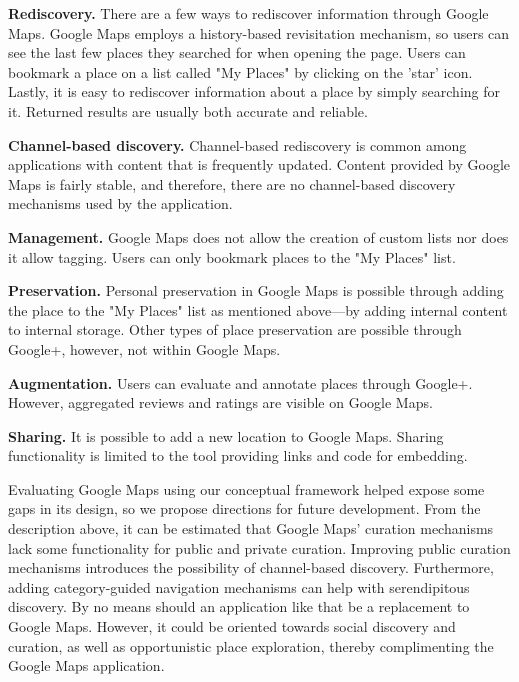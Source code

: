 {\textbf{Rediscovery.} There are a few ways to rediscover information through Google Maps. Google Maps employs a history-based revisitation mechanism, so users can see the last few places they searched for when opening the page. Users can bookmark a place on a list called "My Places" by clicking on the 'star' icon. Lastly, it is easy to rediscover information about a place by simply searching for it. Returned results are usually both accurate and reliable.

\textbf{Channel-based discovery.} Channel-based rediscovery is common among applications with content that is frequently updated. Content provided by Google Maps is fairly stable, and therefore, there are no channel-based discovery mechanisms used by the application.

\textbf{Management.} Google Maps does not allow the creation of custom lists nor does it allow tagging. Users can only bookmark places to the "My Places" list. 

\textbf{Preservation.} Personal preservation in Google Maps is possible through adding the place to the "My Places" list as mentioned above---by adding internal content to internal storage. Other types of place preservation are possible through Google+, however, not within Google Maps.

\textbf{Augmentation.} Users can evaluate and annotate places through Google+. However, aggregated reviews and ratings are visible on Google Maps. 

\textbf{Sharing.} It is possible to add a new location to Google Maps. Sharing functionality is limited to the tool providing links and code for embedding.  

Evaluating Google Maps using our conceptual framework helped expose some gaps in its design, so we propose directions for future development. From the description above, it can be estimated that Google Maps' curation mechanisms lack some functionality for public and private curation. Improving public curation mechanisms introduces the possibility of channel-based discovery. Furthermore, adding category-guided navigation mechanisms can help with serendipitous discovery. By no means should an application like that be a replacement to Google Maps. However, it could be oriented towards social discovery and curation, as well as opportunistic place exploration, thereby complimenting the Google Maps application.  

} %